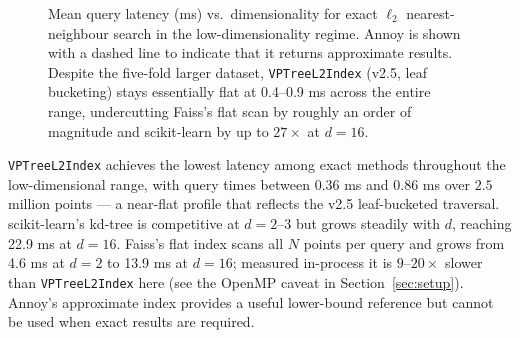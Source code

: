 \documentclass[11pt,a4paper]{article}
\begin{document}
\begin{figure}[h]
\centering
{}
\caption{Mean query latency (ms) vs.\ dimensionality for exact $\ell_2$
  nearest-neighbour search in the low-dimensionality regime.  Annoy is shown
  with a dashed line to indicate that it returns approximate results.
  Despite the five-fold larger dataset, \texttt{VPTreeL2Index} (v2.5, leaf
  bucketing) stays essentially flat at 0.4--0.9 ms across the entire range,
  undercutting Faiss's flat scan by roughly an order of magnitude and
  scikit-learn by up to $27\times$ at $d=16$.}
\label{fig:l2-low}
\end{figure}

\texttt{VPTreeL2Index} achieves the lowest latency among exact methods
throughout the low-dimensional range, with query times between 0.36 ms and
0.86 ms over $2.5$ million points — a near-flat profile that reflects the
v2.5 leaf-bucketed traversal.  scikit-learn's kd-tree is competitive at
$d = 2\text{--}3$ but grows steadily with $d$, reaching 22.9 ms at $d = 16$.
Faiss's flat index scans all $N$ points per query and grows from 4.6 ms at
$d=2$ to 13.9 ms at $d = 16$; measured in-process it is
$9\text{--}20\times$ slower than \texttt{VPTreeL2Index} here (see the
OpenMP caveat in Section~\ref{sec:setup}).  Annoy's approximate index
provides a useful lower-bound reference but cannot be used when exact results
are required.
\end{document}
